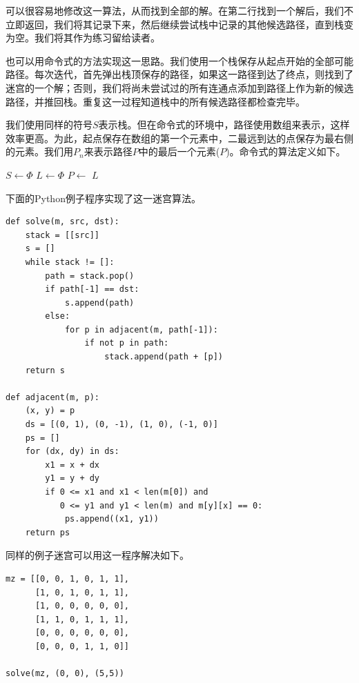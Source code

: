 \documentclass[UTF8]{article}
\begin{document}
可以很容易地修改这一算法，从而找到全部的解。在第二行找到一个解后，我们不立即返回，我们将其记录下来，然后继续尝试栈中记录的其他候选路径，直到栈变为空。我们将其作为练习留给读者。

也可以用命令式的方法实现这一思路。我们使用一个栈保存从起点开始的全部可能路径。每次迭代，首先弹出栈顶保存的路径，如果这一路径到达了终点，则找到了迷宫的一个解；否则，我们将尚未尝试过的所有连通点添加到路径上作为新的候选路径，并推回栈。重复这一过程知道栈中的所有候选路径都检查完毕。

我们使用同样的符号$S$表示栈。但在命令式的环境中，路径使用数组来表示，这样效率更高。为此，起点保存在数组的第一个元素中，二最远到达的点保存为最右侧的元素。我们用$P_n$来表示路径$P$中的最后一个元素($P$)。命令式的算法定义如下。

\begin{algorithmic}[1]
  \State $S \gets \Phi$
  \State {}
  \State $L \gets \Phi$ 
    \State $P \gets$ 
      \State {}
    \Else
          \State {}
        \EndIf
      \EndFor
    \EndIf
  \EndWhile
  \State \Return $L$
\EndFunction
\end{algorithmic}

下面的Python例子程序实现了这一迷宫算法。

\lstset{language=Python}
\begin{lstlisting}
def solve(m, src, dst):
    stack = [[src]]
    s = []
    while stack != []:
        path = stack.pop()
        if path[-1] == dst:
            s.append(path)
        else:
            for p in adjacent(m, path[-1]):
                if not p in path:
                    stack.append(path + [p])
    return s

def adjacent(m, p):
    (x, y) = p
    ds = [(0, 1), (0, -1), (1, 0), (-1, 0)]
    ps = []
    for (dx, dy) in ds:
        x1 = x + dx
        y1 = y + dy
        if 0 <= x1 and x1 < len(m[0]) and
           0 <= y1 and y1 < len(m) and m[y][x] == 0:
            ps.append((x1, y1))
    return ps
\end{lstlisting}

同样的例子迷宫可以用这一程序解决如下。

\lstset{language=Python}
\begin{lstlisting}
mz = [[0, 0, 1, 0, 1, 1],
      [1, 0, 1, 0, 1, 1],
      [1, 0, 0, 0, 0, 0],
      [1, 1, 0, 1, 1, 1],
      [0, 0, 0, 0, 0, 0],
      [0, 0, 0, 1, 1, 0]]

solve(mz, (0, 0), (5,5))
\end{lstlisting}
\end{document}
